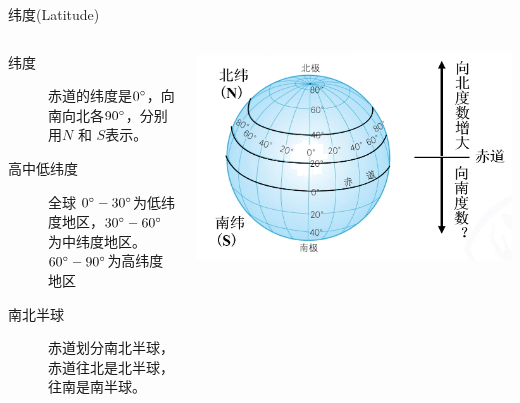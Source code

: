 \documentclass[10pt]{ctexbeamer}
\begin{document}
    \begin{frame}{纬度(Latitude)}
        \begin{columns}
            \begin{description}
                \item[纬度] \alert{赤道的纬度是$0\degree$}，向南向北各$90\degree$，分别用$N$ 和 $S$表示。\\
                \item[高中低纬度] 全球 $0\degree - 30\degree$为低纬度地区，$30\degree - 60\degree$为中纬度地区。
                    $60\degree - 90\degree$为高纬度地区\\
                \item[南北半球] \alert{赤道划分南北半球}，赤道往北是北半球，往南是南半球。
            \end{description}
            \includegraphics[width=.99\textwidth]{assets/latitude.png}
        \end{columns}
    \end{frame}
\end{document}
